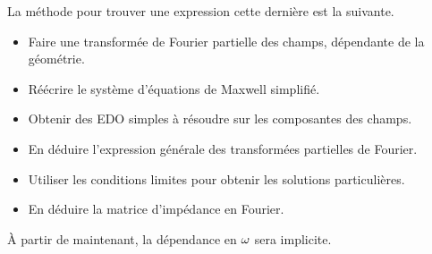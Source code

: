 La méthode pour trouver une expression cette dernière est la suivante.
\begin{itemize}
    \item Faire une transformée de Fourier partielle des champs, dépendante de la géométrie.
    \item Réécrire le système d'équations de Maxwell simplifié.
    \item Obtenir des EDO simples à résoudre sur les composantes des champs.
    \item En déduire l'expression générale des transformées partielles de Fourier.
    \item Utiliser les conditions limites pour obtenir les solutions particulières.
    \item En déduire la matrice d'impédance en Fourier.
\end{itemize}

À partir de maintenant, la dépendance en \(\omega\) sera implicite.

